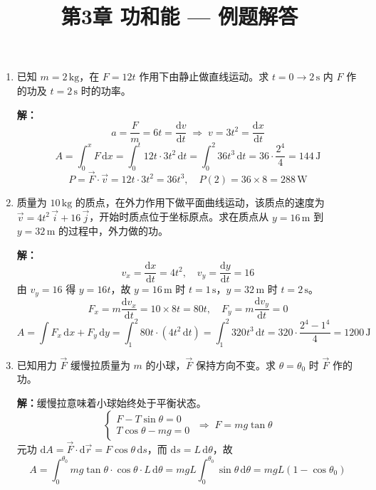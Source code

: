 \documentclass{ctexart}
\title{\textbf{第3章 功和能} --- 例题解答}
\author{}
\date{}
\begin{document}
\maketitle

\begin{enumerate}

\item 已知 $m = 2\,\text{kg}$，在 $F = 12t$ 作用下由静止做直线运动。求 $t = 0 \to 2\,\text{s}$ 内 $F$ 作的功及 $t = 2\,\text{s}$ 时的功率。

\textbf{解：}
\[
a = \frac{F}{m} = 6t = \frac{\mathrm{d}v}{\mathrm{d}t} \;\Longrightarrow\; v = 3t^{2} = \frac{\mathrm{d}x}{\mathrm{d}t}
\]
\[
A = \int_{0}^{x} F\,\mathrm{d}x = \int_{0}^{t} 12t \cdot 3t^{2}\,\mathrm{d}t = \int_{0}^{2} 36t^{3}\,\mathrm{d}t = 36\cdot\frac{2^{4}}{4} = 144\,\text{J}
\]
\[
P = \vec{F}\cdot\vec{v} = 12t \cdot 3t^{2} = 36t^{3},\quad P(2) = 36 \times 8 = 288\,\text{W}
\]

\item 质量为 $10\,\text{kg}$ 的质点，在外力作用下做平面曲线运动，该质点的速度为 $\vec{v} = 4t^{2}\,\vec{i} + 16\,\vec{j}$，开始时质点位于坐标原点。求在质点从 $y = 16\,\text{m}$ 到 $y = 32\,\text{m}$ 的过程中，外力做的功。

\textbf{解：}
\[
v_x = \frac{\mathrm{d}x}{\mathrm{d}t} = 4t^{2},\quad v_y = \frac{\mathrm{d}y}{\mathrm{d}t} = 16
\]
由 $v_y = 16$ 得 $y = 16t$，故 $y = 16\,\text{m}$ 时 $t = 1\,\text{s}$，$y = 32\,\text{m}$ 时 $t = 2\,\text{s}$。
\[
F_x = m\frac{\mathrm{d}v_x}{\mathrm{d}t} = 10 \times 8t = 80t,\quad F_y = m\frac{\mathrm{d}v_y}{\mathrm{d}t} = 0
\]
\[
A = \int F_x\,\mathrm{d}x + F_y\,\mathrm{d}y = \int_{1}^{2} 80t \cdot (4t^{2}\,\mathrm{d}t) = \int_{1}^{2} 320t^{3}\,\mathrm{d}t = 320\cdot\frac{2^{4} - 1^{4}}{4} = 1200\,\text{J}
\]

\item 已知用力 $\vec{F}$ 缓慢拉质量为 $m$ 的小球，$\vec{F}$ 保持方向不变。求 $\theta = \theta_0$ 时 $\vec{F}$ 作的功。

\textbf{解：}缓慢拉意味着小球始终处于平衡状态。
\[
\begin{cases}
F - T\sin\theta = 0 \\
T\cos\theta - mg = 0
\end{cases}
\;\Longrightarrow\; F = mg\tan\theta
\]
元功 $\mathrm{d}A = \vec{F}\cdot\mathrm{d}\vec{r} = F\cos\theta\,\mathrm{d}s$，而 $\mathrm{d}s = L\,\mathrm{d}\theta$，故
\[
A = \int_{0}^{\theta_0} mg\tan\theta \cdot \cos\theta \cdot L\,\mathrm{d}\theta = mgL\int_{0}^{\theta_0} \sin\theta\,\mathrm{d}\theta = mgL(1 - \cos\theta_0)
\]


\end{enumerate}
\end{document}
